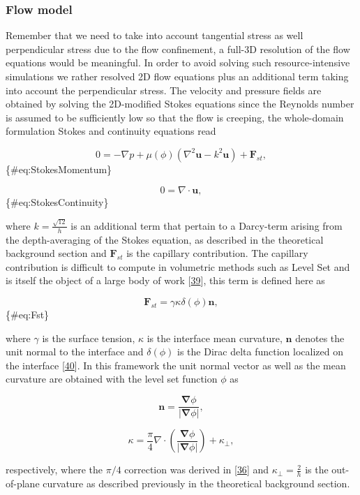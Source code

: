\documentclass[]{article}
\begin{document}
\hypertarget{flow-model}{%
\subsubsection{Flow model}\label{flow-model}}

Remember that we need to take into account tangential stress as well
perpendicular stress due to the flow confinement, a full-3D resolution
of the flow equations would be meaningful. In order to avoid solving
such resource-intensive simulations we rather resolved 2D flow equations
plus an additional term taking into account the perpendicular stress.
The velocity and pressure fields are obtained by solving the 2D-modified
Stokes equations since the Reynolds number is assumed to be sufficiently
low so that the flow is creeping, the whole-domain formulation Stokes
and continuity equations read

\[
0=-\nabla p+\mu(\phi)\left(\nabla^{2}\mathbf{u}-k^{2}\mathbf{u}\right)+\mathbf{F}_{st},
\] \{\#eq:StokesMomentum\}

\[
0=\nabla\cdot\mathbf{u},
\] \{\#eq:StokesContinuity\}

where \(k=\frac{\sqrt{12}}{h}\) is an additional term that pertain to a
Darcy-term arising from the depth-averaging of the Stokes equation, as
described in the theoretical background section and \(\mathbf{F}_{st}\)
is the capillary contribution. The capillary contribution is difficult
to compute in volumetric methods such as Level Set and is itself the
object of a large body of work
{[}\protect\hyperlink{ref-Popinet2018}{39}{]}, this term is defined here
as

\[
\mathbf{F}_{st}=\gamma\kappa\delta(\phi)\mathbf{n},
\] \{\#eq:Fst\}

where \(\gamma\) is the surface tension, \(\kappa\) is the interface
mean curvature, \(\mathbf{n}\) denotes the unit normal to the interface
and \(\delta(\phi)\) is the Dirac delta function localized on the
interface {[}\protect\hyperlink{ref-Galusinski2008}{40}{]}. In this
framework the unit normal vector as well as the mean curvature are
obtained with the level set function \(\phi\) as

\[
\mathbf{n}=\frac{\boldsymbol{\nabla}\phi}{\vert\boldsymbol{\nabla}\phi\vert},
\]

\[
\kappa=\frac{\pi}{4}\nabla\cdot\left(\frac{\boldsymbol{\nabla}\phi}{\vert\boldsymbol{\nabla}\phi\vert}\right)+\kappa_{\perp},
\]

respectively, where the \(\pi/4\) correction was derived in
{[}\protect\hyperlink{ref-park1984two}{36}{]} and
\(\kappa_{\perp}=\frac{2}{h}\) is the out-of-plane curvature as
described previously in the theoretical background section.
\end{document}
